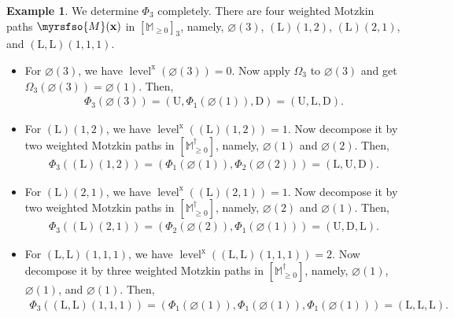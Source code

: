 \documentclass[12pt,reqno]{amsart}
\numberwithin{equation}{section}
\theoremstyle{theorem}
\theoremstyle{definition}
\newtheorem{example}[theorem]{Example}
\theoremstyle{named}
\newcommand{\level}{\operatorname{level}}
\newcommand{\x}{\operatorname{x}}
\newcommand{\cM}{\myrsfso{M}}
\newcommand{\bbM}{\mathbb{M}}
\newcommand{\bfx}{\mathbf{x}}
\newcommand{\rU}{\mathrm{U}}
\newcommand{\rD}{\mathrm{D}}
\newcommand{\rL}{\mathrm{L}}
\begin{document}
\begin{example}
	We determine $\Phi_3$ completely. There are four weighted Motzkin paths $\cM(\bfx)$ in $[\bbM_{\ge 0}]_3$, namely, $\varnothing(3)$, $(\rL)(1,2)$, $(\rL)(2,1)$, and $(\rL,\rL)(1,1,1)$.
	\begin{itemize}[itemindent=*, leftmargin=*, itemsep=2pt, topsep=2pt, parsep=2pt]
		\item For $\varnothing(3)$, we have $\level^{\x}(\varnothing(3)) = 0$. Now apply $\Omega_3$ to $\varnothing(3)$ and get $\Omega_3(\varnothing(3)) = \varnothing(1)$. Then,
		\begin{align*}
			\Phi_3(\varnothing(3)) = (\rU,\Phi_1(\varnothing(1)),\rD) = (\rU,\rL,\rD).
		\end{align*}
		
		\item For $(\rL)(1,2)$, we have $\level^{\x}((\rL)(1,2)) = 1$. Now decompose it by two weighted Motzkin paths in $[\bbM_{\ge 0}^\dagger]$, namely, $\varnothing(1)$ and $\varnothing(2)$. Then,
		\begin{align*}
			\Phi_3((\rL)(1,2)) = (\Phi_1(\varnothing(1)),\Phi_2(\varnothing(2))) = (\rL,\rU,\rD).
		\end{align*}
		
		\item For $(\rL)(2,1)$, we have $\level^{\x}((\rL)(2,1)) = 1$. Now decompose it by two weighted Motzkin paths in $[\bbM_{\ge 0}^\dagger]$, namely, $\varnothing(2)$ and $\varnothing(1)$. Then,
		\begin{align*}
			\Phi_3((\rL)(2,1)) = (\Phi_2(\varnothing(2)),\Phi_1(\varnothing(1))) = (\rU,\rD,\rL).
		\end{align*}
		
		\item For $(\rL,\rL)(1,1,1)$, we have $\level^{\x}((\rL,\rL)(1,1,1)) = 2$. Now decompose it by three weighted Motzkin paths in $[\bbM_{\ge 0}^\dagger]$, namely, $\varnothing(1)$, $\varnothing(1)$, and $\varnothing(1)$. Then,
		\begin{align*}
			\Phi_3((\rL,\rL)(1,1,1)) = (\Phi_1(\varnothing(1)),\Phi_1(\varnothing(1)),\Phi_1(\varnothing(1))) = (\rL,\rL,\rL).
		\end{align*}
	\end{itemize}
\end{example}
\end{document}
